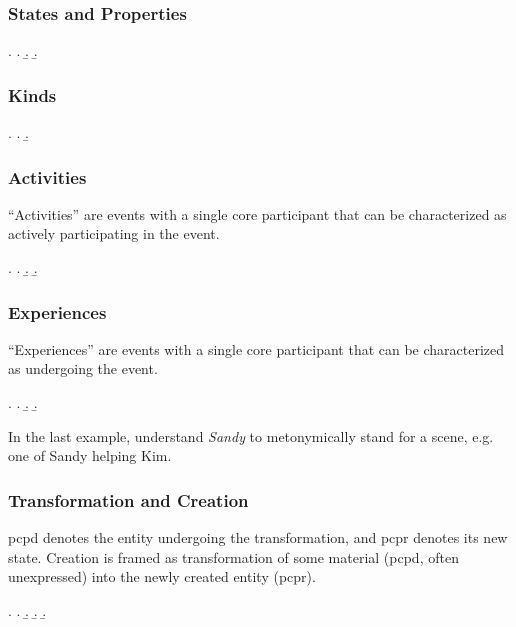 \documentclass[a4paper]{article}
\begin{document}
\subsubsection{States and Properties}

\ex. \a. 
     \b. 
     \b. 

\subsubsection{Kinds}

\ex. \a. 
     \b. 

\subsubsection{Activities}

``Activities'' are events with a single core participant that can be
characterized as actively participating in the event.

\ex. \a. 
     \b. 
     \b. 

\subsubsection{Experiences}

``Experiences'' are events with a single core participant that can be
characterized as undergoing the event.

\ex. \a. 
     \b. 
     \b. 

In the last example, understand \emph{Sandy} to metonymically stand for a scene,
e.g. one of Sandy helping Kim.

\subsubsection{Transformation and Creation}

\textsf{pcpd} denotes the entity undergoing the transformation, and
\textsf{pcpr} denotes its new state. Creation is framed as transformation of
some material (\textsf{pcpd}, often unexpressed) into the newly created entity
(\textsf{pcpr}).

\ex. \a. 
     \b. 
     \b. 
     \b. 
\end{document}

